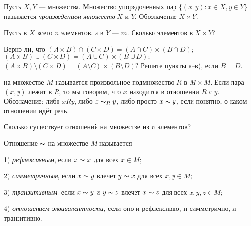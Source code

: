 \documentclass[a4paper,12pt]{article}
\begin{document}

 Пусть $X,Y$ --- множества. Множество упорядоченных пар
$ \{ (x,y) : x \in X, y \in Y \} $ называется {\em произведением множеств}
$X$ и $Y$. Обозначение $X \times Y.$

 Пусть в $X$ всего $n$ элементов, а в $Y$ --- $m$. Сколько элементов в $X \times Y$?

 Верно ли, что
 $(A \times B) \cap (C \times D) = (A \cap C) \times (B \cap D) ;$
 $(A \times B) \cup (C \times D) = (A \cup C) \times (B \cup D) ;$
 $(A \times B)\setminus(C \times D) = (A \setminus C) \times (B \setminus D) ?$
 Решите пункты а--в), если $B=D$.


 на множестве  $M$ называется произвольное
подмножество $R$ в $M \times M.$ Если пара $(x,y)$ лежит в $R$, то мы говорим, что
$x$ находится в отношении $R$ с $y$. 
\\Обозначение: либо $xRy$, либо $x\thicksim_Ry$, либо просто $x\thicksim y$,
если понятно, о каком отношении идёт речь.



 Сколько существует отношений на множестве из $n$ элементов?

 Отношение $\thicksim$ на множестве $M$ называется

1) {\em рефлексивным}, если $x\thicksim x$ для всех $x \in M;$

2) {\em симметричным}, если $x\thicksim y$ влечет $y\thicksim x$ для всех $x,y \in M;$

3) {\em транзитивным}, если $x \thicksim y$ и $y \thicksim z$ влечет $x \thicksim z$ для всех $x,y,z \in M;$

4) {\em отношением эквивалентности}, если оно и рефлексивно, и симметрично, и транзитивно.
\end{document}
